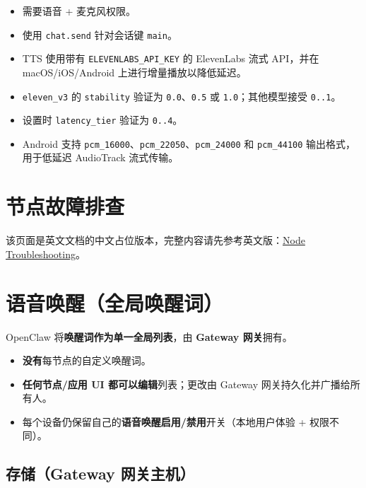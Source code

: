 \begin{itemize}
  \item 需要语音 + 麦克风权限。
  \item 使用 \texttt{chat.send} 针对会话键 \texttt{main}。
  \item TTS 使用带有 \texttt{ELEVENLABS\_API\_KEY} 的 ElevenLabs 流式 API，并在 macOS/iOS/Android 上进行增量播放以降低延迟。
  \item \texttt{eleven\_v3} 的 \texttt{stability} 验证为 \texttt{0.0}、\texttt{0.5} 或 \texttt{1.0}；其他模型接受 \texttt{0..1}。
  \item 设置时 \texttt{latency\_tier} 验证为 \texttt{0..4}。
  \item Android 支持 \texttt{pcm\_16000}、\texttt{pcm\_22050}、\texttt{pcm\_24000} 和 \texttt{pcm\_44100} 输出格式，用于低延迟 AudioTrack 流式传输。
\end{itemize}



\clearpage

\section{节点故障排查}


该页面是英文文档的中文占位版本，完整内容请先参考英文版：\href{/nodes/troubleshooting}{Node Troubleshooting}。


\clearpage

\section{语音唤醒（全局唤醒词）}


OpenClaw 将\textbf{唤醒词作为单一全局列表}，由 \textbf{Gateway 网关}拥有。

\begin{itemize}
  \item \textbf{没有}每节点的自定义唤醒词。
  \item \textbf{任何节点/应用 UI 都可以编辑}列表；更改由 Gateway 网关持久化并广播给所有人。
  \item 每个设备仍保留自己的\textbf{语音唤醒启用/禁用}开关（本地用户体验 + 权限不同）。
\end{itemize}


\subsection{存储（Gateway 网关主机）}


